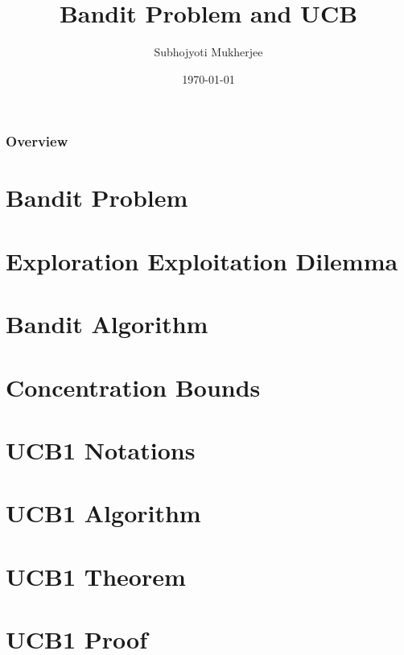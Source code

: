 \documentclass{beamer}
\title[Short title]{Bandit Problem and UCB} %
\author{Subhojyoti Mukherjee} %
\institute[IIT Madras] %
{
IIT Madras \\ %
\medskip
}
\date{\today} %
\begin{document}
\begin{frame}
\titlepage %
\end{frame}

\begin{frame}
\frametitle{Overview} %
\tableofcontents %
\end{frame}


\section{Bandit Problem}
\section{Exploration Exploitation Dilemma}
\section{Bandit Algorithm}
\section{Concentration Bounds}
\section{UCB1 Notations}
\section{UCB1 Algorithm}
\section{UCB1 Theorem}
\section{UCB1 Proof}
\end{document}
